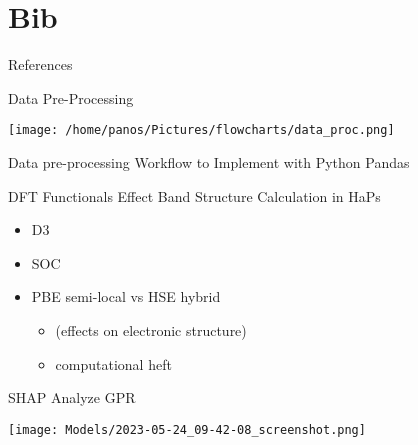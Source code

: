 \documentclass[10pt, aspectratio=169, presentation]{beamer}
\begin{document}
\section{Bib}
\label{sec:org8bc0795}
\begin{frame}[allowframebreaks]{References}
\AtNextBibliography{\tiny}
\printbibliography
\end{frame}
\appendix
\begin{frame}[label={sec:org4f8e699}]{Data Pre-Processing}
\begin{center}
\texttt{[image: /home/panos/Pictures/flowcharts/data\_proc.png]}
\end{center}
Data pre-processing Workflow to Implement with Python Pandas
\end{frame}
\begin{frame}[label={sec:org62f0d27}]{DFT Functionals Effect Band Structure Calculation in HaPs}
\begin{itemize}
\item D3
\item SOC
\item PBE semi-local vs HSE hybrid
\begin{itemize}
\item (effects on electronic structure)
\item computational heft
\end{itemize}
\end{itemize}
\end{frame}
\begin{frame}[label={sec:org3653240}]{SHAP Analyze GPR}
\begin{center}
\texttt{[image: Models/2023-05-24\_09-42-08\_screenshot.png]}
\end{center}
\end{frame}
\end{document}
